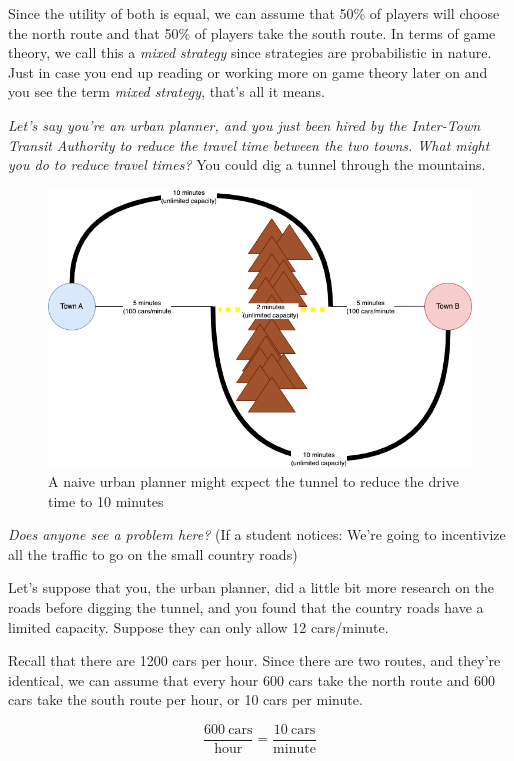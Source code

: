 \documentclass[11pt]{article}
\begin{document}
Since the utility of both is equal, we can assume that 50\% of players will choose the north route and that 50\% of players take the south route. In terms of game theory, we call this a {\it mixed strategy} since strategies are probabilistic in nature. Just in case you end up reading or working more on game theory later on and you see the term {\it mixed strategy}, that's all it means.


{\it Let's say you're an urban planner, and you just been hired by the Inter-Town Transit Authority to reduce the travel time between the two towns. What might you do to reduce travel times?} You could dig a tunnel through the mountains.

\begin{figure}
    \centering
    \includegraphics[width=5in]{braess_2.png}
    \caption{A naive urban planner might expect the tunnel to reduce the drive time to 10 minutes}
\end{figure}

{\it Does anyone see a problem here?} (If a student notices: We're going to incentivize all the traffic to go on the small country roads)

Let's suppose that you, the urban planner, did a little bit more research on the roads before digging the tunnel, and you found that the country roads have a limited capacity. Suppose they can only allow 12 cars/minute. 

Recall that there are 1200 cars per hour. Since there are two routes, and they're identical, we can assume that every hour 600 cars take the north route and 600 cars take the south route per hour, or 10 cars per minute. 

$$ \frac{600~\text{cars}}{\text{hour}} = \frac{10~\text{cars}}{\text{minute}}$$
\end{document}

